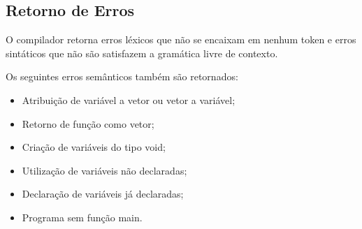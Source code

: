 \subsection{Retorno de Erros}

O compilador retorna erros léxicos que não se encaixam em nenhum token e erros sintáticos que não são satisfazem a gramática livre de contexto.

Os seguintes erros semânticos também são retornados: 

\begin{itemize}
	\item Atribuição de variável a vetor ou vetor a variável;
	\item Retorno de função como vetor;
	\item Criação de variáveis do tipo void;
	\item Utilização de variáveis não declaradas; 
	\item Declaração de variáveis já declaradas;
	\item Programa sem função main.
\end{itemize}


\clearpage